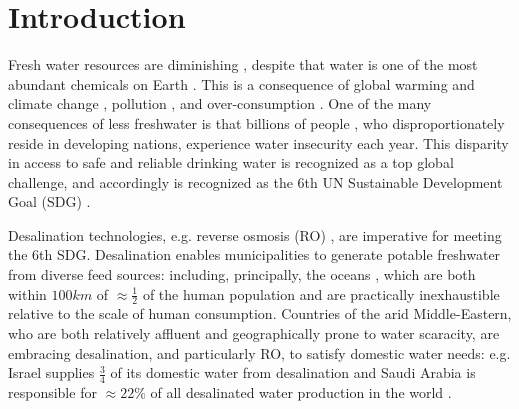 
\section{Introduction}
Fresh water resources are diminishing \cite{Laghari2013MeltingUncertainty,Rasul2008GlobalRanges}, despite that water is one of the most abundant chemicals on Earth \cite{Shiklomanov1993WorldResources}. This is a consequence of global warming \cite{Hansen2006GlobalChange,IPCC2018Global1.5C} and climate change \cite{Thomas2004ExtinctionChange}, pollution \cite{Pappas2017EnergySuperpower,Zhao2016DecouplingInvestment,Moller2010DistributionWatershed}, and over-consumption \cite{Bongaarts2009HumanTransition,Meyer1992HumanChange}. One of the many consequences of less freshwater is that billions of people \cite{Unicef2017ThirstingClimate}, who disproportionately reside in developing nations, experience water insecurity each year. This disparity in access to safe and reliable drinking water is recognized as a top global challenge, and accordingly is recognized as the 6th UN Sustainable Development Goal (SDG) \cite{Jones2018TheOutlook}. 

Desalination technologies, e.g. reverse osmosis (RO) \cite{Malaeb2011ReverseReview}, are imperative for meeting the 6th SDG. Desalination enables municipalities to generate potable freshwater from diverse feed sources: including, principally, the oceans \cite{2018DepartmentWater,Service2006DesalinationUp}, which are both within $100 km$ of $\approx \frac{1}{2}$ of the human population \cite{Amy2017Membrane-basedProspects} and are practically inexhaustible relative to the scale of human consumption. Countries of the arid Middle-Eastern, who are both relatively affluent and geographically prone to water scaracity, are embracing desalination, and  particularly RO, to satisfy domestic water needs: e.g. Israel supplies $\frac{3}{4}$ of its domestic water from desalination \cite{Shemer2017SustainableImpact} and Saudi Arabia is responsible for $\approx 22\%$ of all desalinated water production in the world \cite{Council2021WaterPrivatization}.

